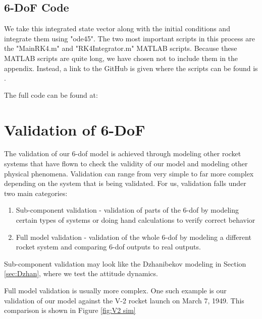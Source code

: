 \documentclass[12pt]{report}
\begin{document}
\subsection{6-DoF Code}
We take this integrated \gls{state vector} along with the initial conditions and integrate them using "ode45". The two most important scripts in this process are the "MainRK4.m" and "RK4Integrator.m" MATLAB scripts. Because these MATLAB scripts are quite long, we have chosen not to include them in the appendix. Instead, a link to the GitHub is given where the scripts can be found is .

The full code can be found at: %
\section{Validation of 6-DoF}
The validation of our 6-\gls{dof} model is achieved through modeling other rocket systems that have flown to check the validity of our model and modeling other physical phenomena. Validation can range from very simple to far more complex depending on the system that is being validated. For us, validation falls under two main categories:
\begin{enumerate}
    \item Sub-component validation - validation of parts of the 6-\gls{dof} by modeling certain types of systems or doing hand calculations to verify correct behavior
    \item Full model validation - validation of the whole 6-\gls{dof} by modeling a different rocket system and comparing 6-\gls{dof} outputs to real outputs.
\end{enumerate}

Sub-component validation may look like the Dzhanibekov modeling in Section \ref{sec:Dzhan}, where we test the attitude dynamics.

Full model validation is usually more complex. One such example is our validation of our model against the V-2 rocket launch on March 7, 1949. This comparison is shown in Figure \ref{fig:V2 sim}
\end{document}
